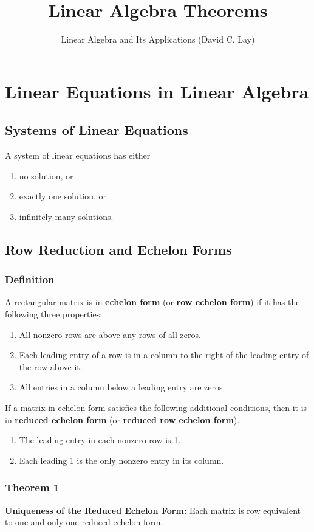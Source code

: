 \documentclass[letterpaper,11pt]{article}
\title{Linear Algebra Theorems}
\author{Linear Algebra and Its Applications (David C. Lay)}
\begin{document}
	\maketitle
	\section{Linear Equations in Linear Algebra}
		\subsection{Systems of Linear Equations}
			A system of linear equations has either
			\begin{enumerate}
				\item no solution, or
				\item exactly one solution, or
				\item infinitely many solutions.
			\end{enumerate}
		\subsection{Row Reduction and Echelon Forms}
			\subsubsection{Definition}
				A rectangular matrix is in \textbf{echelon form} (or \textbf{row echelon form}) if it has the following three properties:
				\begin{enumerate}
					\item All nonzero rows are above any rows of all zeros.
					\item Each leading entry of a row is in a column to the right of the leading entry of the row above it.
					\item All entries in a column below a leading entry are zeros.
				\end{enumerate}
				If a matrix in echelon form satisfies the following additional conditions, then it is in \textbf{reduced echelon form} (or \textbf{reduced row echelon form}).
				\begin{enumerate}
					\item The leading entry in each nonzero row is 1.
					\item Each leading 1 is the only nonzero entry in its column.
				\end{enumerate}
			\subsubsection{Theorem 1}
				\textbf{Uniqueness of the Reduced Echelon Form:} Each matrix is row equivalent to one and only one reduced echelon form.
\end{document}
